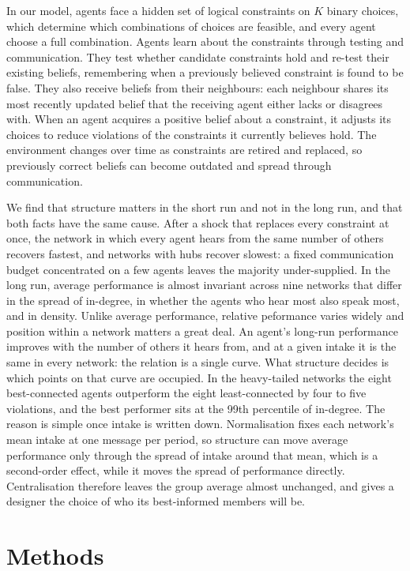 \documentclass[11pt]{article}
\begin{document}
In our model, agents face a hidden set of logical constraints on $K$ binary choices, which determine which combinations of choices are feasible, and every agent choose a full combination. Agents learn about the constraints through testing and communication. They test whether candidate constraints hold and re-test their existing beliefs, remembering when a previously believed constraint is found to be false. They also receive beliefs from their neighbours: each neighbour shares its most recently updated belief that the receiving agent either lacks or disagrees with. When an agent acquires a positive belief about a constraint, it adjusts its choices to reduce violations of the constraints it currently believes hold. The environment changes over time as constraints are retired and replaced, so previously correct beliefs can become outdated and spread through communication.

We find that structure matters in the short run and not in the long run, and that both facts have the same cause. After a shock that replaces every constraint at once, the network in which every agent hears from the same number of others recovers fastest, and networks with hubs recover slowest: a fixed communication budget concentrated on a few agents leaves the majority under-supplied. In the long run, average performance is almost invariant across nine networks that differ in the spread of in-degree, in whether the agents who hear most also speak most, and in density. Unlike average performance, relative peformance varies widely and position within a network matters a great deal. An agent's long-run performance improves with the number of others it hears from, and at a given intake it is the same in every network: the relation is a single curve. What structure decides is which points on that curve are occupied. In the heavy-tailed networks the eight best-connected agents outperform the eight least-connected by four to five violations, and the best performer sits at the 99th percentile of in-degree. The reason is simple once intake is written down. Normalisation fixes each network's mean intake at one message per period, so structure can move average performance only through the spread of intake around that mean, which is a second-order effect, while it moves the spread of performance directly. Centralisation therefore leaves the group average almost unchanged, and gives a designer the choice of who its best-informed members will be.


\section{Methods}\label{sec:methods}
\end{document}
